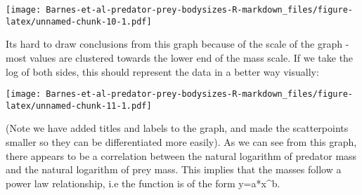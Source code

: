 \documentclass[
]{article}
\newenvironment{Shaded}{\begin{snugshade}}{\end{snugshade}}
\newcommand{\DataTypeTok}[1]{\textcolor[rgb]{0.13,0.29,0.53}{#1}}
\newcommand{\DecValTok}[1]{\textcolor[rgb]{0.00,0.00,0.81}{#1}}
\newcommand{\KeywordTok}[1]{\textcolor[rgb]{0.13,0.29,0.53}{\textbf{#1}}}
\newcommand{\NormalTok}[1]{#1}
\newcommand{\OperatorTok}[1]{\textcolor[rgb]{0.81,0.36,0.00}{\textbf{#1}}}
\newcommand{\StringTok}[1]{\textcolor[rgb]{0.31,0.60,0.02}{#1}}
\begin{document}
\texttt{[image: Barnes-et-al-predator-prey-bodysizes-R-markdown\_files/figure-latex/unnamed-chunk-10-1.pdf]}

Its hard to draw conclusions from this graph because of the scale of the
graph - most values are clustered towards the lower end of the mass
scale. If we take the log of both sides, this should represent the data
in a better way visually:

\begin{Shaded}
\end{Shaded}

\texttt{[image: Barnes-et-al-predator-prey-bodysizes-R-markdown\_files/figure-latex/unnamed-chunk-11-1.pdf]}

(Note we have added titles and labels to the graph, and made the
scatterpoints smaller so they can be differentiated more easily). As we
can see from this graph, there appears to be a correlation between the
natural logarithm of predator mass and the natural logarithm of prey
mass. This implies that the masses follow a power law relationship, i.e
the function is of the form y=a*x\^{}b.
\end{document}
